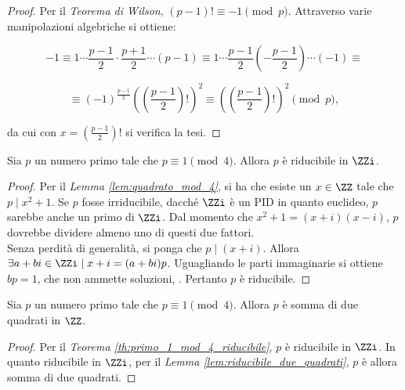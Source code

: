 \begin{proof}
    Per il \textit{Teorema di Wilson}, $(p-1)! \equiv -1 \pmod p$.
    Attraverso varie manipolazioni algebriche si ottiene:

    \[-1 \equiv 1 \cdots \frac{p-1}{2} \cdot \frac{p+1}{2} \cdots (p-1) \equiv 1 \cdots \frac{p-1}{2} \left(-\frac{p-1}{2}\right) \cdots (-1) \equiv\]

    \[ \equiv (-1)^{\frac{p-1}{2}} \left(\left( \frac{p-1}{2} \right)!\right)^2 \equiv
        \left(\left( \frac{p-1}{2} \right)!\right)^2 \pmod p,
    \]

    \vskip 0.1in

    da cui con $x = \left( \frac{p-1}{2} \right)!$ si verifica la
    tesi.
\end{proof}

\begin{theorem}
    \label{th:primo_1_mod_4_riducibile}
    Sia $p$ un numero primo tale che $p \equiv 1 \pmod4$. Allora
    $p$ è riducibile in $\ZZi$.
\end{theorem}

\begin{proof}
    Per il \textit{Lemma \ref{lem:quadrato_mod_4}}, si ha che esiste
    un $x \in \ZZ$ tale che $p \mid x^2+1$. Se $p$ fosse irriducibile,
    dacché $\ZZi$ è un PID in quanto euclideo, $p$ sarebbe anche un
    primo di $\ZZi$. Dal momento che $x^2+1=(x+i)(x-i)$, $p$ dovrebbe
    dividere almeno uno di questi due fattori. \\

    Senza perdità di generalità, si ponga che $p \mid (x+i)$. Allora
    $\exists a+bi \in \ZZi \mid x+i=(a+bi)p$. Uguagliando le parti
    immaginarie si ottiene $bp=1$, che non ammette soluzioni, \Lightning{}. Pertanto $p$ è riducibile.
\end{proof}

\begin{corollary}
    \label{th:teorema_natale}
    Sia $p$ un numero primo tale che $p \equiv 1 \pmod4$. Allora
    $p$ è somma di due quadrati in $\ZZ$.
\end{corollary}

\begin{proof}
    Per il \textit{Teorema \ref{th:primo_1_mod_4_riducibile}},
    $p$ è riducibile in $\ZZi$. In quanto riducibile in $\ZZi$, per
    il \textit{Lemma \ref{lem:riducibile_due_quadrati}}, $p$ è allora
    somma di due quadrati.
\end{proof}

